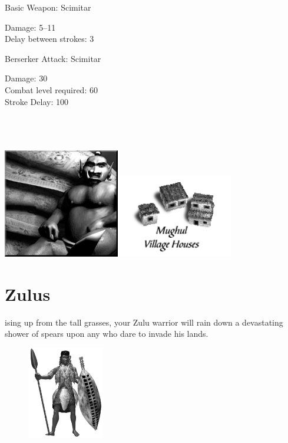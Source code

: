 Basic Weapon: Scimitar
\begin{adjustwidth}{1cm}{}
	Damage: 5–11 \\
	Delay between strokes: 3
\end{adjustwidth}
Berserker Attack: Scimitar
\begin{adjustwidth}{1cm}{}
	Damage: 30 \\
	Combat level required: 60 \\
	Stroke Delay: 100 \\ \\ \\ \\
\end{adjustwidth}

\begin{center}
	\includegraphics[width=2in]{Adjinni}\hspace{1pt}\includegraphics[width=2in]{Imughalhouse}
\end{center}

\clearpage

\section{Zulus}


ising up from the tall grasses, your Zulu warrior will rain down a devastating shower of spears upon any who dare to invade his lands.
	
\begin{figure}
	\begin{center}
		\vspace{-20pt}
		\includegraphics[width=0.3\textwidth]{Azulu}
	\end{center}
	\vspace{-20pt}
\end{figure}

